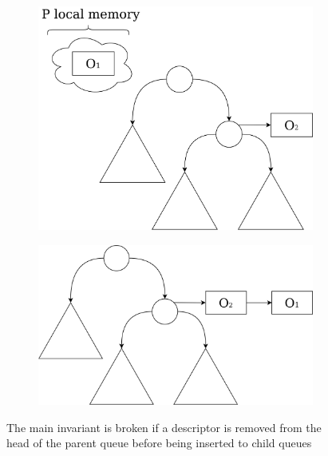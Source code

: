 \documentclass[times, dvipsnames,%
               languages={russian,english} %
              ]{itmo-student-thesis}
\begin{document}
\begin{figure}[H]
\begin{subfigure}[b]{0.45\linewidth}
          \label{remove-last-2}
     \end{subfigure}
     \hfill
     \begin{subfigure}[b]{0.45\linewidth}
          \centering
          \includegraphics[width=\linewidth]{pics/remove-last-3.png}
          \label{remove-last-3}
     \end{subfigure}
     \hfill
     \begin{subfigure}[b]{0.45\linewidth}
          \centering
          \includegraphics[width=\linewidth]{pics/remove-last-4.png}
          \label{remove-last-4}
     \end{subfigure}
    \caption{The main invariant is broken if a descriptor is removed from the head of the parent queue before being inserted to child queues}
    \label{remove-last-pic}
\end{figure}
 
\end{document}
